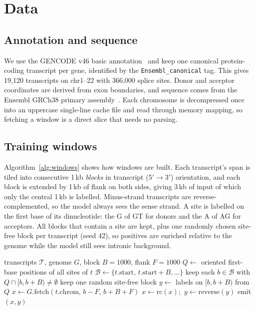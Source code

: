 \documentclass[conference]{IEEEtran}
\begin{document}
\section{Data}\label{sec:data}
\subsection{Annotation and sequence}
We use the GENCODE v46 basic annotation~\cite{frankish2023gencode} and keep one canonical protein-coding transcript per gene, identified by the \texttt{Ensembl\_canonical} tag. This gives 19{,}120 transcripts on chr1--22 with 366{,}000 splice sites. Donor and acceptor coordinates are derived from exon boundaries, and sequence comes from the Ensembl GRCh38 primary assembly~\cite{harrison2024ensembl}. Each chromosome is decompressed once into an uppercase single-line cache file and read through memory mapping, so fetching a window is a direct slice that needs no parsing.

\subsection{Training windows}
Algorithm~\ref{alg:windows} shows how windows are built. Each transcript's span is tiled into consecutive 1\,kb \emph{blocks} in transcript (5$'\!\to\!$3$'$) orientation, and each block is extended by 1\,kb of flank on both sides, giving 3\,kb of input of which only the central 1\,kb is labelled. Minus-strand transcripts are reverse-complemented, so the model always sees the sense strand. A site is labelled on the first base of its dinucleotide: the G of GT for donors and the A of AG for acceptors. All blocks that contain a site are kept, plus one randomly chosen site-free block per transcript (seed 42), so positives are enriched relative to the genome while the model still sees intronic background.

\begin{algorithm}[t]
\caption{Transcript-oriented window construction}\label{alg:windows}
\begin{algorithmic}[1]
\Require transcripts $\mathcal{T}$, genome $G$, block $B{=}1000$, flank $F{=}1000$
  \State $Q\gets$ oriented first-base positions of all sites of $t$
  \State $\mathcal{B}\gets\{t.\mathrm{start},\,t.\mathrm{start}{+}B,\dots\}$ 
  \State keep each $b\in\mathcal{B}$ with $Q\cap[b,b{+}B)\neq\emptyset$
  \State keep one random site-free block
    \State $y\gets$ labels on $[b,b{+}B)$ from $Q$ 
    \State $x\gets G.\mathrm{fetch}(t.\mathrm{chrom},\,b{-}F,\,b{+}B{+}F)$
     $x\gets\mathrm{rc}(x)$;\ $y\gets\mathrm{reverse}(y)$ \EndIf
    \State emit $(x,y)$
  \EndFor
\EndFor
\end{algorithmic}
\end{algorithm}
\end{document}
